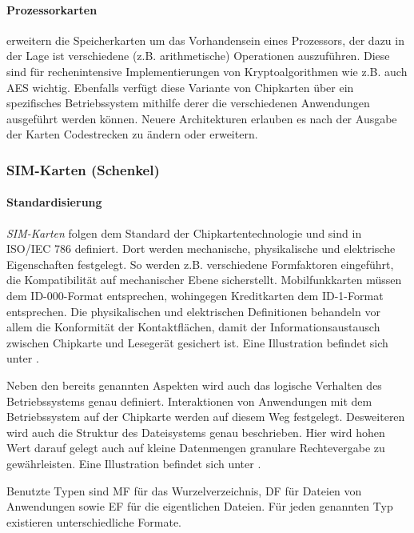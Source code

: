 \paragraph{Prozessorkarten} erweitern die Speicherkarten um das Vorhandensein
eines Prozessors, der dazu in der Lage ist verschiedene (z.B. arithmetische)
Operationen auszuführen. Diese sind für rechenintensive Implementierungen
von Kryptoalgorithmen wie z.B. auch AES wichtig. Ebenfalls verfügt diese
Variante von Chipkarten über ein spezifisches Betriebssystem mithilfe derer
die verschiedenen Anwendungen ausgeführt werden können.
Neuere Architekturen erlauben es nach der Ausgabe der Karten Codestrecken
zu ändern oder erweitern.

\subsubsection{SIM-Karten (Schenkel)}

\paragraph{Standardisierung}
\textit{SIM-Karten} folgen dem Standard der Chipkartentechnologie und sind in
ISO/IEC 786 definiert. Dort werden mechanische, physikalische und elektrische
Eigenschaften festgelegt.
So werden z.B. verschiedene Formfaktoren eingeführt, die Kompatibilität
auf mechanischer Ebene sicherstellt. Mobilfunkkarten müssen dem ID-000-Format
entsprechen, wohingegen Kreditkarten dem ID-1-Format entsprechen. Die physikalischen und elektrischen
Definitionen behandeln vor allem die Konformität der Kontaktflächen, damit
der Informationsaustausch zwischen Chipkarte und Lesegerät gesichert ist.
Eine Illustration befindet sich unter .

Neben den bereits genannten Aspekten wird auch das logische Verhalten des Betriebssystems
genau definiert. Interaktionen von Anwendungen mit dem Betriebssystem auf der Chipkarte
werden auf diesem Weg festgelegt. Desweiteren wird auch die Struktur des Dateisystems
genau beschrieben. Hier wird hohen Wert darauf gelegt auch auf kleine Datenmengen
granulare Rechtevergabe zu gewährleisten.
Eine Illustration befindet sich unter .

Benutzte Typen sind \ac{MF} für das Wurzelverzeichnis,
\ac{DF} für Dateien von Anwendungen sowie
\ac{EF} für die eigentlichen Dateien. Für jeden genannten Typ
existieren unterschiedliche Formate.

